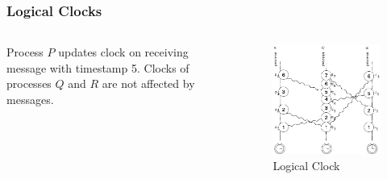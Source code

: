 \documentclass{beamer}
\begin{document}
\frame
{
	\frametitle{Logical Clocks}

	\begin{columns}
	\begin{column}{0.6\textwidth}

		Process $P$ updates clock on receiving message with timestamp 5.
		Clocks of processes $Q$ and $R$ are not affected by messages.


	\end{column}
	\begin{column}{0.4\textwidth}

		\begin{figure}[ht!]
		\includegraphics[width=\textwidth]{files/ClockDist-Impl-Logical-Clock-6.png}
		\caption{Logical Clock}
		\end{figure}


	\end{column}
	\end{columns}


}
\end{document}
